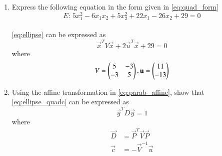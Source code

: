 \renewcommand{\theequation}{\theenumi}
\begin{enumerate}[label=\arabic*.,ref=\thesubsection.\theenumi]

\item Express the following equation in the form given in \eqref{eq:quad_form}
\begin{equation}
E:\, 5x_1^2-6x_1x_2 + 5x_2^2+22x_1-26x_2+29=0
\label{eq:ellipse}
\end{equation}
\\
\solution \eqref{eq:ellipse} can be expressed as
\begin{equation}
\vec{x}^TV\vec{x} + 2\vec{u}^T\vec{x}  + 29=0
\label{eq:ellipse_quadc}
\end{equation}
%
where
\begin{equation}
V = \begin{pmatrix}5 & -3 \\ -3 & 5\end{pmatrix}, \mathbf{u} = \begin{pmatrix}11 \\ -13\end{pmatrix}
\label{eq:ellipsevu}
\end{equation}
%
\item Using the affine transformation in \eqref{eq:parab_affine}, show that 
\eqref{eq:ellipse_quadc} can be expressed as
\begin{equation}
\vec{y}^TD\vec{y}= 1
\label{eq:ellipseo}
\end{equation}
%
where
\begin{align}
\label{eq:ellipse_parmas_d}
\vec{D} &= 
\vec{P}^T\vec{V}\vec{P}
\\
\vec{c}&= -\vec{V}^{-1}\vec{u}
\label{eq:ellipse_parmas_c}
\end{align}

\end{enumerate}
